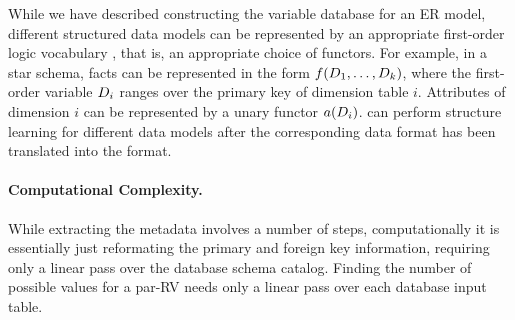 %


%

While we have described constructing the variable database for an ER model, different structured data models can be represented by an appropriate first-order logic vocabulary \cite{Kimmig2015}, that is, an appropriate choice of functors. For example, in a star schema, facts can be represented in the form $f(D_{1},\ldots,D_{k})$, where the first-order variable $D_{i}$ ranges over the primary key of dimension table $i$. Attributes of dimension $i$ can be represented by a unary functor $a(D_{i})$. \FB can perform structure learning for different data models after the corresponding data format has been translated into the \RVD format.

\paragraph{Computational Complexity.} While extracting the metadata involves a number of steps, computationally it is essentially just reformating the primary and foreign key information, requiring only  a linear pass over the database schema catalog. 
Finding the number of possible values for a par-RV needs only a linear pass over each database input table. 

